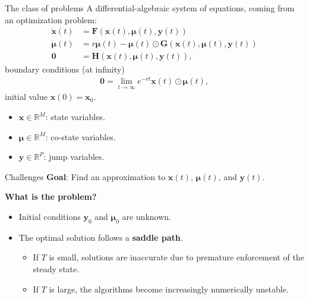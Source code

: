 \documentclass[aspectratio=169,10pt]{beamer}
\newcommand{\emphcolor}[1]{\textbf{\textcolor{emphcolorval}{#1}}}
\newcommand{\bx}{\mathbf{x}}
\newcommand{\by}{\mathbf{y}}
\newcommand{\bmu}{\boldsymbol{\mu}}
\newcommand{\bF}{\mathbf{F}}
\newcommand{\bG}{\mathbf{G}}
\newcommand{\bH}{\mathbf{H}}
\begin{document}
\begin{frame}{The class of problems}
A differential-algebraic system of equations, coming from an optimization problem:	
	\begin{align}
		\dot{\bx}(t) &= \bF(\bx(t),\bmu(t)
		,\by(t))\\ %
		\dot{\bmu}(t) &= r \bmu(t)
		- \bmu(t)
		\odot \bG(\bx(t), \bmu(t)
		, \by(t))\\
		\mathbf{0} &= \bH(\bx(t), \bmu(t), \by(t)),
	\end{align}
	boundary conditions (at infinity)
	\begin{align}
		\mathbf{0} = \lim_{t\rightarrow\infty} e^{-rt} \bx(t)\odot\bmu(t),
	\end{align}
	initial value $\bx(0) = \bx_0$.
	\begin{itemize}
		\item $\bx\in \mathbb{R}^{M}$: state variables.
		\item $\bmu \in \mathbb{R}^M$: co-state variables.
		\item $\mathbf{y}\in\mathbb{R}^{P}$: jump variables.
	\end{itemize}
\end{frame}

\begin{frame}{Challenges}
	\emphcolor{Goal}: Find an approximation to $\bx(t)$, $\bmu(t)$, and $\by(t)$.\\
	\vspace{0.1in}
	
	\emphcolor{What is the problem?}
	\begin{itemize}
		\item Initial conditions $\by_0$ and $\bmu_0$ are unknown.
		\vspace{0.1in}
		
		\item The optimal solution follows a \emphcolor{saddle path}.
		\vspace{0.1in}
		\begin{itemize}
			\item If $T$ is small, solutions are inaccurate due to premature enforcement of the steady state.
			\vspace{0.1in}
			\item If $T$ is large, the algorithms become increasingly numerically unstable.
		\end{itemize}
	\end{itemize}
\end{frame}
\end{document}
